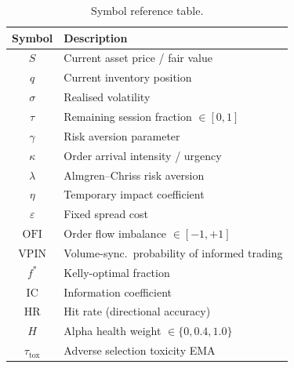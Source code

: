 \documentclass[11pt]{article}
\theoremstyle{definition}
\begin{document}
\begin{table}[H]
\centering
\caption{Symbol reference table.}
\label{tab:notation}
\small
\begin{tabular}{@{}cl@{}}
\toprule
\textbf{Symbol} & \textbf{Description} \\
\midrule
$S$ & Current asset price / fair value \\
$q$ & Current inventory position \\
$\sigma$ & Realised volatility \\
$\tau$ & Remaining session fraction $\in [0,1]$ \\
$\gamma$ & Risk aversion parameter \\
$\kappa$ & Order arrival intensity / urgency \\
$\lambda$ & Almgren--Chriss risk aversion \\
$\eta$ & Temporary impact coefficient \\
$\varepsilon$ & Fixed spread cost \\
$\text{OFI}$ & Order flow imbalance $\in [-1,+1]$ \\
$\text{VPIN}$ & Volume-sync.\ probability of informed trading \\
$f^*$ & Kelly-optimal fraction \\
$\text{IC}$ & Information coefficient \\
$\text{HR}$ & Hit rate (directional accuracy) \\
$H$ & Alpha health weight $\in \{0, 0.4, 1.0\}$ \\
$\tau_{\text{tox}}$ & Adverse selection toxicity EMA \\
\bottomrule
\end{tabular}
\end{table}
\end{document}
